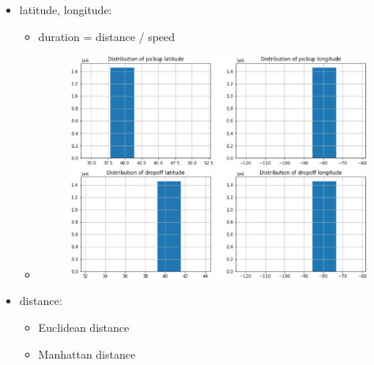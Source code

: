 \documentclass[
 size=14pt,
 paper=smartboard,  %
 mode=present, 		%
 display=slides, 	%
 style=tuliplab,  	%
 pauseslide,
 fleqn,leqno]{powerdot}
\begin{document}
\begin{slide}[toc=,bm=]{}
  \begin{itemize}
  \item latitude, longitude:
  \begin{itemize}
    \item duration = distance / speed
    \item \begin{figure}\includegraphics[scale=0.3]{figures/14.eps}\end{figure}
  \end{itemize}
\end{itemize}
\end{slide}

\begin{slide}[toc=,bm=]{}
  \begin{itemize}
  \item distance:
  \begin{itemize}
    \item Euclidean distance
    \item Manhattan distance
  \end{itemize}
\end{itemize}
\end{slide}
\end{document}
